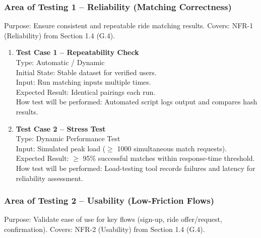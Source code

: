 \documentclass[12pt, titlepage]{article}
\begin{document}
\subsubsection{Area of Testing 1 – Reliability (Matching Correctness)}

Purpose: Ensure consistent and repeatable ride matching results.  
Covers: NFR-1 (Reliability) from Section 1.4 (G.4).

\begin{enumerate}
\item \textbf{Test Case 1 – Repeatability Check}\\
Type: Automatic / Dynamic\\
Initial State: Stable dataset for verified users.\\
Input: Run matching inputs multiple times.\\
Expected Result: Identical pairings each run.\\
How test will be performed: Automated script logs output and compares hash results.\\[5pt]

\item \textbf{Test Case 2 – Stress Test}\\
Type: Dynamic Performance Test\\
Input: Simulated peak load ($\geq$ 1000 simultaneous match requests).\\
Expected Result: $\geq$ 95\% successful matches within response-time threshold.\\
How test will be performed: Load-testing tool records failures and latency for reliability assessment.\\
\end{enumerate}

\subsubsection{Area of Testing 2 – Usability (Low-Friction Flows)}

Purpose: Validate ease of use for key flows (sign-up, ride offer/request, confirmation).  
Covers: NFR-2 (Usability) from Section 1.4 (G.4).
\end{document}
